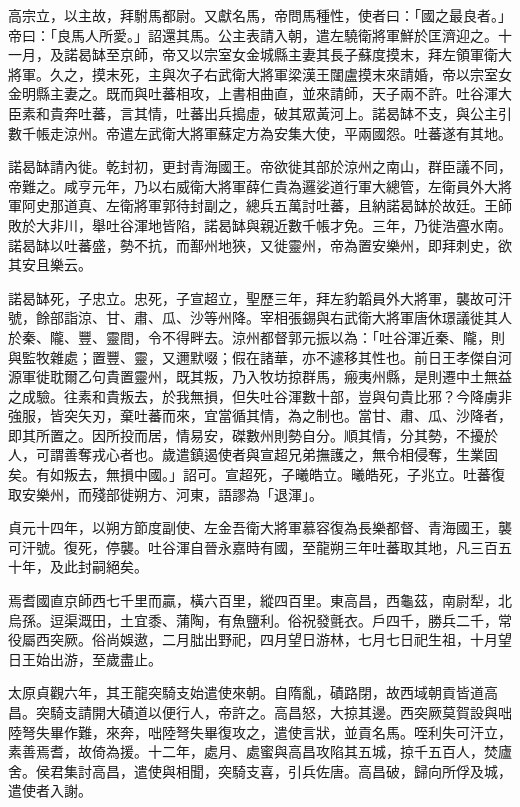 \begin{pinyinscope}
 高宗立，以主故，拜駙馬都尉。又獻名馬，帝問馬種性，使者曰：「國之最良者。」帝曰：「良馬人所愛。」詔還其馬。公主表請入朝，遣左驍衛將軍鮮於匡濟迎之。十一月，及諾曷缽至京師，帝又以宗室女金城縣主妻其長子蘇度摸末，拜左領軍衛大將軍。久之，摸末死，主與次子右武衛大將軍梁漢王闥盧摸末來請婚，帝以宗室女金明縣主妻之。既而與吐蕃相攻，上書相曲直，並來請師，天子兩不許。吐谷渾大臣素和貴奔吐蕃，言其情，吐蕃出兵搗虛，破其眾黃河上。諾曷缽不支，與公主引數千帳走涼州。帝遣左武衛大將軍蘇定方為安集大使，平兩國怨。吐蕃遂有其地。



 諾曷缽請內徙。乾封初，更封青海國王。帝欲徙其部於涼州之南山，群臣議不同，帝難之。咸亨元年，乃以右威衛大將軍薛仁貴為邏娑道行軍大總管，左衛員外大將軍阿史那道真、左衛將軍郭待封副之，總兵五萬討吐蕃，且納諾曷缽於故廷。王師敗於大非川，舉吐谷渾地皆陷，諾曷缽與親近數千帳才免。三年，乃徙浩亹水南。諾曷缽以吐蕃盛，勢不抗，而鄯州地狹，又徙靈州，帝為置安樂州，即拜刺史，欲其安且樂云。



 諾曷缽死，子忠立。忠死，子宣超立，聖歷三年，拜左豹韜員外大將軍，襲故可汗號，餘部詣涼、甘、肅、瓜、沙等州降。宰相張錫與右武衛大將軍唐休璟議徙其人於秦、隴、豐、靈間，令不得畔去。涼州都督郭元振以為：「吐谷渾近秦、隴，則與監牧雜處；置豐、靈，又邇默啜；假在諸華，亦不遽移其性也。前日王孝傑自河源軍徙耽爾乙句貴置靈州，既其叛，乃入牧坊掠群馬，瘢夷州縣，是則遷中土無益之成驗。往素和貴叛去，於我無損，但失吐谷渾數十部，豈與句貴比邪？今降虜非強服，皆突矢刃，棄吐蕃而來，宜當循其情，為之制也。當甘、肅、瓜、沙降者，即其所置之。因所投而居，情易安，磔數州則勢自分。順其情，分其勢，不擾於人，可謂善奪戎心者也。歲遣鎮遏使者與宣超兄弟撫護之，無令相侵奪，生業固矣。有如叛去，無損中國。」詔可。宣超死，子曦皓立。曦皓死，子兆立。吐蕃復取安樂州，而殘部徙朔方、河東，語謬為「退渾」。



 貞元十四年，以朔方節度副使、左金吾衛大將軍慕容復為長樂都督、青海國王，襲可汗號。復死，停襲。吐谷渾自晉永嘉時有國，至龍朔三年吐蕃取其地，凡三百五十年，及此封嗣絕矣。



 焉耆國直京師西七千里而贏，橫六百里，縱四百里。東高昌，西龜茲，南尉犁，北烏孫。逗渠溉田，土宜黍、蒲陶，有魚鹽利。俗祝發氈衣。戶四千，勝兵二千，常役屬西突厥。俗尚娛遨，二月朏出野祀，四月望日游林，七月七日祀生祖，十月望日王始出游，至歲盡止。



 太原貞觀六年，其王龍突騎支始遣使來朝。自隋亂，磧路閉，故西域朝貢皆道高昌。突騎支請開大磧道以便行人，帝許之。高昌怒，大掠其邊。西突厥莫賀設與咄陸弩失畢作難，來奔，咄陸弩失畢復攻之，遣使言狀，並貢名馬。咥利失可汗立，素善焉耆，故倚為援。十二年，處月、處蜜與高昌攻陷其五城，掠千五百人，焚廬舍。侯君集討高昌，遣使與相聞，突騎支喜，引兵佐唐。高昌破，歸向所俘及城，遣使者入謝。




\end{pinyinscope}
